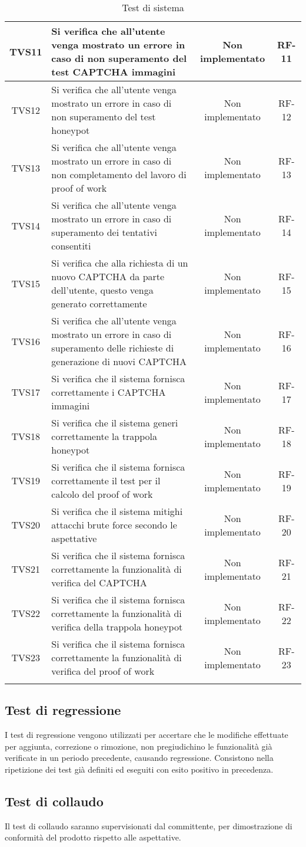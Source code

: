 \begin{center}
\begin{xltabular}{\textwidth}{|c|X|c|c|}
		\hline
		TVS11 & Si verifica che all’utente venga mostrato un errore in caso di non superamento del test CAPTCHA immagini & Non implementato & RF-11\\
		\hline
		TVS12 & Si verifica che all’utente venga mostrato un errore in caso di non superamento del test honeypot & Non implementato & RF-12\\
		\hline
		TVS13 & Si verifica che all’utente venga mostrato un errore in caso di non completamento del lavoro di proof of work & Non implementato & RF-13\\
		\hline
		TVS14 & Si verifica che all’utente venga mostrato un errore in caso di superamento dei tentativi consentiti & Non implementato & RF-14\\
		\hline
		TVS15 & Si verifica che alla richiesta di un nuovo CAPTCHA da parte dell'utente, questo venga generato correttamente & Non implementato & RF-15\\
		\hline
		TVS16 & Si verifica che all’utente venga mostrato un errore in caso di superamento delle richieste di generazione di nuovi CAPTCHA & Non implementato & RF-16\\
		\hline
		TVS17 & Si verifica che il sistema fornisca correttamente i CAPTCHA immagini & Non implementato & RF-17\\
		\hline
		TVS18 & Si verifica che il sistema generi correttamente la trappola honeypot & Non implementato & RF-18\\
		\hline
		TVS19 & Si verifica che il sistema fornisca correttamente il test per il calcolo del proof of work & Non implementato & RF-19\\
		\hline
		TVS20 & Si verifica che il sistema mitighi attacchi brute force secondo le aspettative & Non implementato & RF-20\\
		\hline
		TVS21 & Si verifica che il sistema fornisca correttamente la funzionalità di verifica del CAPTCHA & Non implementato & RF-21\\
		\hline
		TVS22 & Si verifica che il sistema fornisca correttamente la funzionalità di verifica della trappola honeypot & Non implementato & RF-22\\
		\hline
		TVS23 & Si verifica che il sistema fornisca correttamente la funzionalità di verifica del proof of work & Non implementato & RF-23\\
		\hline
		\caption{Test di sistema}
	\end{xltabular}
\end{center}


\subsection{Test di regressione}
I test di regressione vengono utilizzati per accertare che le modifiche effettuate per aggiunta, correzione o rimozione, non pregiudichino le funzionalità già verificate in un periodo precedente, causando regressione. Consistono nella ripetizione dei test già definiti ed eseguiti con esito positivo in precedenza.

\subsection{Test di collaudo}
Il test di collaudo saranno supervisionati dal committente, per dimostrazione di conformità del prodotto rispetto alle aspettative.
